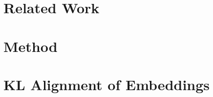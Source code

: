 \documentclass[11pt]{article}
\begin{document}
\section{Related Work}

\section{Method}

\section{KL Alignment of Embeddings}




\appendix

\end{document}
